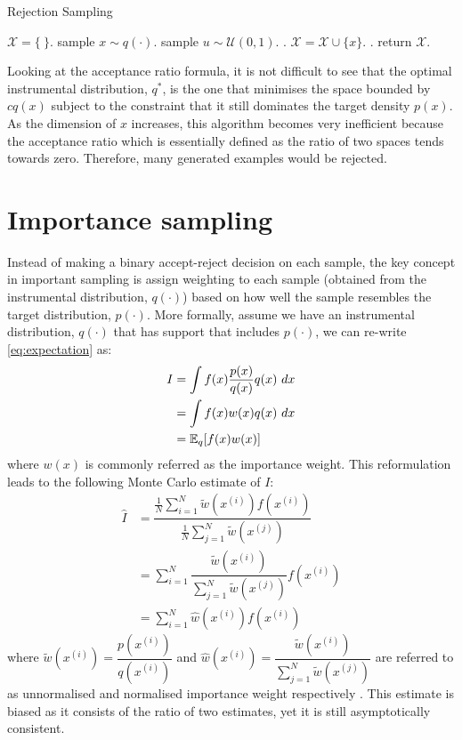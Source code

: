 \begin{algorithm}
\caption{Rejection Sampling}\label{algo:rejectionsampling}
\begin{algorithmic}[1]
\State $\mathcal{X} = \{\ \}$.
\Repeat
  \State sample $x \sim q(\cdot)$.
  \State sample $u \sim \mathcal{U}(0,1)$.
  .
    \State $\mathcal{X} = \mathcal{X} \cup \{x\}$.
  \EndIf
{}.
\State return $\mathcal{X}$.
\EndFunction
\end{algorithmic}
\end{algorithm}

Looking at the acceptance ratio formula, it is not difficult to see that the optimal instrumental distribution, $q^*$, is the one that minimises the space bounded by $cq(x)$ subject to the constraint that it still dominates the target density $p(x)$. As the dimension of $x$ increases, this algorithm becomes very inefficient because the acceptance ratio which is essentially defined as the ratio of two spaces tends towards zero. Therefore, many generated examples would be rejected. 

\section{Importance sampling}
\label{sec:IS}
Instead of making a binary accept-reject decision on each sample, the key concept in important sampling is assign weighting to each sample (obtained from the instrumental distribution, $q(\cdot)$) based on how well the sample resembles the target distribution, $p(\cdot)$. More formally, assume we have an instrumental distribution, $q(\cdot)$ that has support that includes $p(\cdot)$, we can re-write \eqref{eq:expectation} as:
\begin{align}
  I &= \int f(x)\dfrac{p(x)}{q(x)}q(x)~dx \nonumber \\
    &= \int f(x)w(x)q(x)~dx \nonumber \\
    &= \operatorname{\mathbb{E}}_q[f(x)w(x)]
\end{align}
where $w(x)$ is commonly referred as the importance weight. This reformulation leads to the following Monte Carlo estimate of $I$:
\begin{align}
  \hat{I} &= \dfrac{\frac{1}{N} \sum^N_{i=1} \tilde{w}(x^{(i)})f(x^{(i)})}{\frac{1}{N} \sum^N_{j=1} \tilde{w}(x^{(j)})} \nonumber \\ 
          &= \sum^N_{i=1} \dfrac{\tilde{w}(x^{(i)})}{\sum^N_{j=1} \tilde{w}(x^{(j)})} f(x^{(i)}) \nonumber \\
          &= \sum^N_{i=1} \hat{w}(x^{(i)}) f(x^{(i)})  \label{eq:is} 
\end{align}
where $\tilde{w}(x^{(i)}) = \dfrac{p(x^{(i)})}{q(x^{(i)})}$ and $\hat{w}(x^{(i)})  = \dfrac{\tilde{w}(x^{(i)})}{\sum^N_{j=1} \tilde{w}(x^{(j)})}$ are referred to as unnormalised and normalised importance weight respectively \cite{CO05}. This estimate is biased as it consists of the ratio of two estimates, yet it is still asymptotically consistent.

